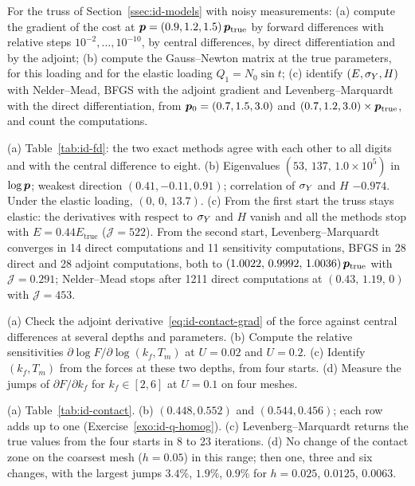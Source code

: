 
\label{exo:id-truss}
%
For the truss of Section~\ref{ssec:id-models} with noisy measurements: (a) compute
the gradient of the cost at $\bm{p}=(0.9,1.2,1.5)\,\bm{p}_{\mathrm{true}}$ by forward
differences with relative steps $10^{-2},\dots,10^{-10}$, by central differences,
by direct differentiation and by the adjoint; (b) compute the Gauss--Newton matrix
at the true parameters, for this loading and for the elastic loading
$Q_1=N_0\sin t$; (c) identify $(E,\sigma_{Y},H)$ with Nelder--Mead, BFGS with the adjoint
gradient and Levenberg--Marquardt with the direct differentiation, from
$\bm{p}_0=(0.7,1.5,3.0)$ and $(0.7,1.2,3.0)\times\bm{p}_{\mathrm{true}}$, and count the
computations.
\begin{solution}
(a) Table~\ref{tab:id-fd}: the two exact methods agree with each other to all
digits and with the central difference to eight. (b) Eigenvalues
$(53,\,137,\,1.0\times10^5)$ in $\log\bm{p}$; weakest direction
$(0.41,-0.11,0.91)$; correlation of $\sigma_{Y}$ and $H$ $-0.974$. Under the elastic loading,
$(0,\,0,\,13.7)$. (c) From the first start the truss stays elastic: the derivatives
with respect to $\sigma_{Y}$ and $H$ vanish and all the methods stop with $E=0.44E_{\mathrm{true}}$
($\mathcal J=522$). From the second start, Levenberg--Marquardt converges in 14 direct
computations and 11 sensitivity computations, BFGS in 28 direct and 28 adjoint
computations, both to $(1.0022,\,0.9992,\,1.0036)\,\bm{p}_{\mathrm{true}}$ with
$\mathcal J=0.291$; Nelder--Mead stops after 1211 direct computations at
$(0.43,\,1.19,\,0)$ with $\mathcal J=453$.

\end{solution}

\label{exo:id-indent}
%
(a) Check the adjoint derivative~\eqref{eq:id-contact-grad} of the force against
central differences at several depths and parameters. (b) Compute the relative
sensitivities $\partial\log F/\partial\log(k_f,T_m)$ at $U=0.02$ and $U=0.2$. (c) Identify
$(k_f,T_m)$ from the forces at these two depths, from four starts. (d) Measure the
jumps of $\partial F/\partial k_f$ for $k_f\in[2,6]$ at $U=0.1$ on four meshes.
\begin{solution}
(a) Table~\ref{tab:id-contact}. (b) $(0.448,0.552)$ and $(0.544,0.456)$; each row
adds up to one (Exercise~\ref{exo:id-q-homog}). (c) Levenberg--Marquardt returns the
true values from the four starts in 8 to 23 iterations. (d) No change of the contact
zone on the coarsest mesh ($h=0.05$) in this range; then one, three and six changes,
with the largest jumps $3.4\%$, $1.9\%$, $0.9\%$ for $h=0.025$, $0.0125$, $0.0063$.

\end{solution}

